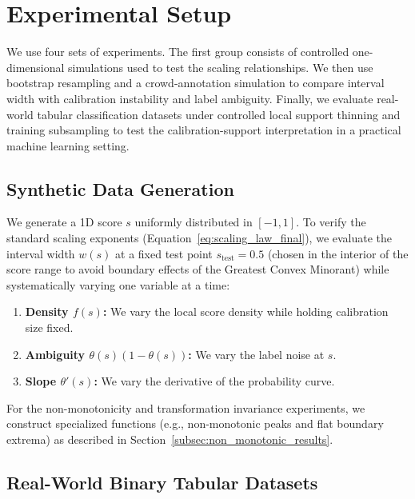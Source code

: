 \documentclass[11pt]{article}
\begin{document}
	\section{Experimental Setup}
	\label{sec:experiments}
	
	We use four sets of experiments. The first group consists of controlled one-dimensional simulations used to test the scaling relationships. We then use bootstrap resampling and a crowd-annotation simulation to compare interval width with calibration instability and label ambiguity. Finally, we evaluate real-world tabular classification datasets under controlled local support thinning and training subsampling to test the calibration-support interpretation in a practical machine learning setting.
	
	\subsection{Synthetic Data Generation}
	We generate a 1D score $s$ uniformly distributed in $[-1, 1]$. To verify the standard scaling exponents (Equation~\ref{eq:scaling_law_final}), we evaluate the interval width $w(s)$ at a fixed test point $s_{\text{test}} = 0.5$ (chosen in the interior of the score range to avoid boundary effects of the Greatest Convex Minorant) while systematically varying one variable at a time:
	\begin{enumerate}
		\item \textbf{Density $f(s)$:} We vary the local score density while holding calibration size fixed.
		\item \textbf{Ambiguity $\theta(s)(1-\theta(s))$:} We vary the label noise at $s$.
		\item \textbf{Slope $\theta'(s)$:} We vary the derivative of the probability curve.
	\end{enumerate}
	For the non-monotonicity and transformation invariance experiments, we construct specialized functions (e.g., non-monotonic peaks and flat boundary extrema) as described in Section~\ref{subsec:non_monotonic_results}.
	

	\subsection{Real-World Binary Tabular Datasets}
	\label{subsec:real_data_setup}
\end{document}
